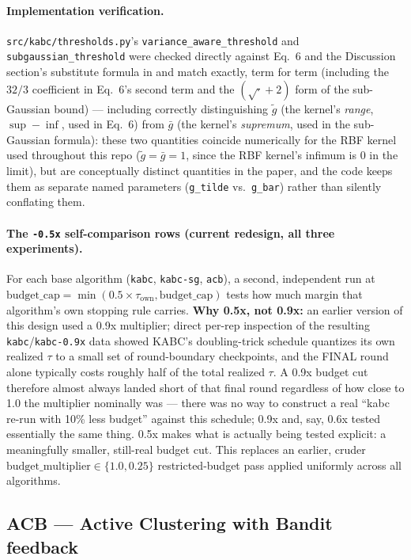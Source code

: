 \documentclass[11pt]{article}
\begin{document}
\paragraph{Implementation verification.} \texttt{src/kabc/thresholds.py}'s
\texttt{variance\_aware\_threshold} and \texttt{subgaussian\_threshold}
were checked directly against Eq.~6 and the Discussion section's
substitute formula in \cite{kabc2026} and match exactly, term for term
(including the $32/3$ coefficient in Eq.~6's second term and the
$(\sqrt{\cdot}+2)$ form of the sub-Gaussian bound) --- including correctly
distinguishing $\tilde g$ (the kernel's \emph{range}, $\sup-\inf$, used in
Eq.~6) from $\bar g$ (the kernel's \emph{supremum}, used in the
sub-Gaussian formula): these two quantities coincide numerically for the
RBF kernel used throughout this repo ($\tilde g=\bar g=1$, since the RBF
kernel's infimum is $0$ in the limit), but are conceptually distinct
quantities in the paper, and the code keeps them as separate named
parameters (\texttt{g\_tilde} vs.\ \texttt{g\_bar}) rather than silently
conflating them.

\paragraph{The \texttt{-0.5x} self-comparison rows (current redesign, all
three experiments).} For each base algorithm (\texttt{kabc},
\texttt{kabc-sg}, \texttt{acb}), a second, independent run at
$\text{budget\_cap} = \min(0.5\times\tau_{\text{own}}, \text{budget\_cap})$
tests how much margin that algorithm's own stopping rule carries. \textbf{Why
0.5x, not 0.9x:} an earlier version of this design used a 0.9x multiplier;
direct per-rep inspection of the resulting \texttt{kabc}/\texttt{kabc-0.9x}
data showed KABC's doubling-trick schedule quantizes its own realized $\tau$
to a small set of round-boundary checkpoints, and the FINAL round alone
typically costs roughly half of the total realized $\tau$. A 0.9x budget cut
therefore almost always landed short of that final round regardless of how
close to 1.0 the multiplier nominally was --- there was no way to construct
a real ``kabc re-run with 10\% less budget'' against this schedule; 0.9x and,
say, 0.6x tested essentially the same thing. 0.5x makes what is actually
being tested explicit: a meaningfully smaller, still-real budget cut. This
replaces an earlier, cruder $\text{budget\_multiplier}\in\{1.0,0.25\}$
restricted-budget pass applied uniformly across all algorithms.

\subsection{ACB --- Active Clustering with Bandit feedback}
\end{document}
